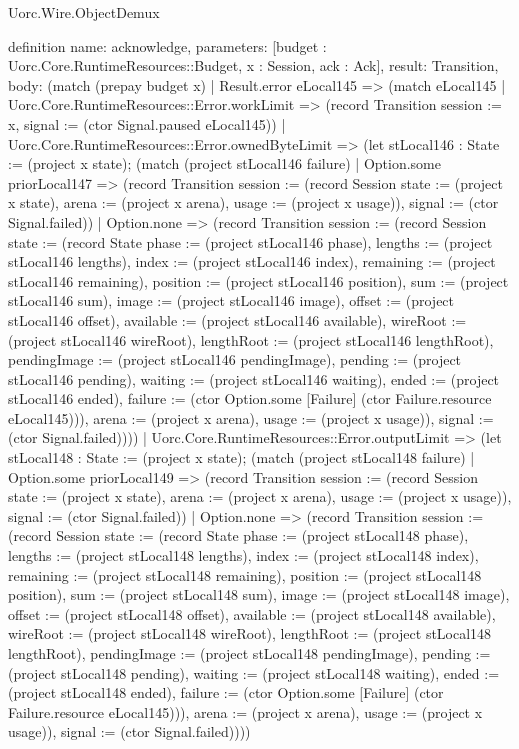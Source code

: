 \begin{lexlean}{Uorc.Wire.ObjectDemux}
\begin{semanticmodule}
definition{
  name: acknowledge,
  parameters: [budget : Uorc.Core.RuntimeResources::Budget, x : Session, ack : Ack],
  result: Transition,
  body: (match (prepay budget x)
    | Result.error eLocal145 => (match eLocal145
      | Uorc.Core.RuntimeResources::Error.workLimit => (record Transition {session := x, signal := (ctor Signal.paused eLocal145)})
      | Uorc.Core.RuntimeResources::Error.ownedByteLimit => (let stLocal146 : State := (project x state); (match (project stLocal146 failure)
        | Option.some priorLocal147 => (record Transition {session := (record Session {state := (project x state), arena := (project x arena), usage := (project x usage)}), signal := (ctor Signal.failed)})
        | Option.none => (record Transition {session := (record Session {state := (record State {phase := (project stLocal146 phase), lengths := (project stLocal146 lengths), index := (project stLocal146 index), remaining := (project stLocal146 remaining), position := (project stLocal146 position), sum := (project stLocal146 sum), image := (project stLocal146 image), offset := (project stLocal146 offset), available := (project stLocal146 available), wireRoot := (project stLocal146 wireRoot), lengthRoot := (project stLocal146 lengthRoot), pendingImage := (project stLocal146 pendingImage), pending := (project stLocal146 pending), waiting := (project stLocal146 waiting), ended := (project stLocal146 ended), failure := (ctor Option.some [Failure] (ctor Failure.resource eLocal145))}), arena := (project x arena), usage := (project x usage)}), signal := (ctor Signal.failed)})))
      | Uorc.Core.RuntimeResources::Error.outputLimit => (let stLocal148 : State := (project x state); (match (project stLocal148 failure)
        | Option.some priorLocal149 => (record Transition {session := (record Session {state := (project x state), arena := (project x arena), usage := (project x usage)}), signal := (ctor Signal.failed)})
        | Option.none => (record Transition {session := (record Session {state := (record State {phase := (project stLocal148 phase), lengths := (project stLocal148 lengths), index := (project stLocal148 index), remaining := (project stLocal148 remaining), position := (project stLocal148 position), sum := (project stLocal148 sum), image := (project stLocal148 image), offset := (project stLocal148 offset), available := (project stLocal148 available), wireRoot := (project stLocal148 wireRoot), lengthRoot := (project stLocal148 lengthRoot), pendingImage := (project stLocal148 pendingImage), pending := (project stLocal148 pending), waiting := (project stLocal148 waiting), ended := (project stLocal148 ended), failure := (ctor Option.some [Failure] (ctor Failure.resource eLocal145))}), arena := (project x arena), usage := (project x usage)}), signal := (ctor Signal.failed)})))
}
\end{semanticmodule}
\end{lexlean}
